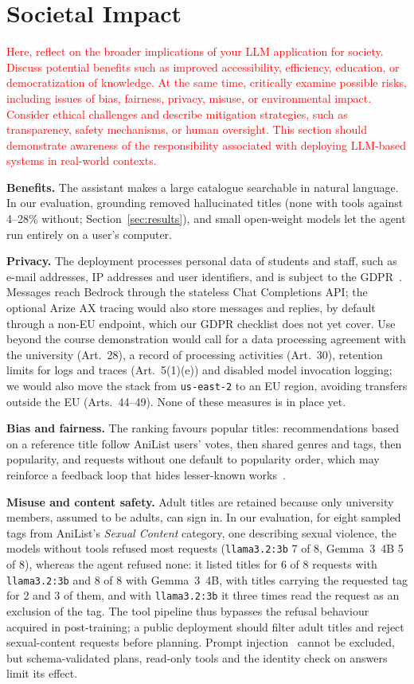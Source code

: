 \documentclass[a4paper,10pt]{article}
\newcommand{\instructions}[1]{\textcolor{red}{#1}}
\begin{document}
\section{Societal Impact}
\label{sec:societal}
\instructions{Here, reflect on the broader implications of your LLM application for society. Discuss potential benefits such as improved accessibility, efficiency, education, or democratization of knowledge. At the same time, critically examine possible risks, including issues of bias, fairness, privacy, misuse, or environmental impact. Consider ethical challenges and describe mitigation strategies, such as transparency, safety mechanisms, or human oversight. This section should demonstrate awareness of the responsibility associated with deploying LLM-based systems in real-world contexts.}

\textbf{Benefits.} The assistant makes a large catalogue searchable in natural language. In our evaluation, grounding removed hallucinated titles (none with tools against 4--28\% without; Section~\ref{sec:results}), and small open-weight models let the agent run entirely on a user's computer.

\textbf{Privacy.} The deployment processes personal data of students and staff, such as e-mail addresses, IP addresses and user identifiers, and is subject to the GDPR~\cite{gdpr}. Messages reach Bedrock through the stateless Chat Completions API; the optional Arize AX tracing would also store messages and replies, by default through a non-EU endpoint, which our GDPR checklist does not yet cover. Use beyond the course demonstration would call for a data processing agreement with the university (Art.~28), a record of processing activities (Art.~30), retention limits for logs and traces (Art.~5(1)(e)) and disabled model invocation logging; we would also move the stack from \texttt{us-east-2} to an EU region, avoiding transfers outside the EU (Arts.~44--49). None of these measures is in place yet.

\textbf{Bias and fairness.} The ranking favours popular titles: recommendations based on a reference title follow AniList users' votes, then shared genres and tags, then popularity, and requests without one default to popularity order, which may reinforce a feedback loop that hides lesser-known works~\cite{chaney2018confounding}.

\textbf{Misuse and content safety.} Adult titles are retained because only university members, assumed to be adults, can sign in. In our evaluation, for eight sampled tags from AniList's \emph{Sexual Content} category, one describing sexual violence, the models without tools refused most requests (\texttt{llama3.2:3b} 7 of 8, Gemma~3~4B 5 of 8), whereas the agent refused none: it listed titles for 6 of 8 requests with \texttt{llama3.2:3b} and 8 of 8 with Gemma~3~4B, with titles carrying the requested tag for 2 and 3 of them, and with \texttt{llama3.2:3b} it three times read the request as an exclusion of the tag. The tool pipeline thus bypasses the refusal behaviour acquired in post-training; a public deployment should filter adult titles and reject sexual-content requests before planning. Prompt injection~\cite{perez2022ignore} cannot be excluded, but schema-validated plans, read-only tools and the identity check on answers limit its effect.
\end{document}
